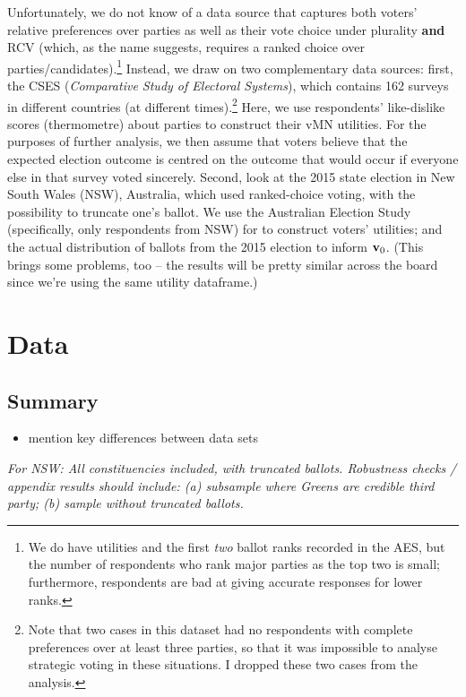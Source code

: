 \documentclass[11pt, letter, margin = 2 in]{article}
\begin{document}
Unfortunately, we do not know of a data source that captures both voters' relative preferences over parties as well as their vote choice under plurality \textbf{and} RCV (which, as the name suggests, requires a ranked choice over parties/candidates).\footnote{We do have utilities and the first \textit{two} ballot ranks recorded in the AES, but the number of respondents who rank major parties as the top two is small; furthermore, respondents are bad at giving accurate responses for lower ranks.} Instead, we draw on two complementary data sources: first, the CSES (\textit{Comparative Study of Electoral Systems}), which contains 162 surveys in different countries (at different times).\footnote{Note that two cases in this dataset had no respondents with complete preferences over at least three parties, so that it was impossible to analyse strategic voting in these situations. I dropped these two cases from the analysis.} Here, we use respondents' like-dislike scores (thermometre) about parties to construct their vMN utilities. For the purposes of further analysis, we then assume that voters believe that the expected election outcome is centred on the outcome that would occur if everyone else in that survey voted sincerely. Second, look at the 2015 state election in New South Wales (NSW), Australia, which used ranked-choice voting, with the possibility to truncate one's ballot. We use the Australian Election Study (specifically, only respondents from NSW) for to construct voters' utilities; and the actual distribution of ballots from the 2015 election to inform ${\bf v}_0$. (This brings some problems, too -- the results will be pretty similar across the board since we're using the same utility dataframe.)

\section{Data}

\subsection{Summary}

\begin{itemize}
	\item mention key differences between data sets
\end{itemize}

\textit{For NSW: All constituencies included, with truncated ballots. Robustness checks / appendix results should include: (a) subsample where Greens are credible third party; (b) sample without truncated ballots.}
\end{document}
